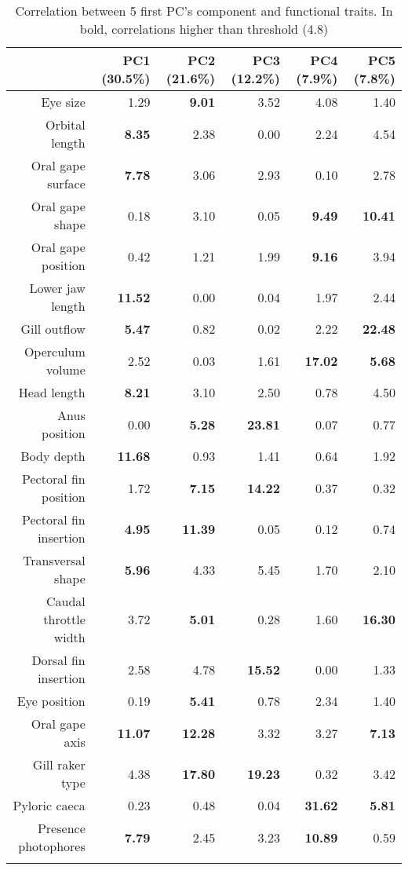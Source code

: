 \begin{table}[ht]
\centering
\caption{Correlation between 5 first PC's component and functional traits. In bold, correlations higher than threshold (4.8)}
\label{table:cont_abs}
\begin{adjustbox}{max width=1.1\textwidth,center}
\begin{tabular}{rrrrrr}
  \hline
 & PC1 (30.5\%) & PC2 (21.6\%) & PC3 (12.2\%) & PC4 (7.9\%) & PC5 (7.8\%) \\ 
  \hline
  Eye size & 1.29 & \textbf{9.01} & 3.52 & 4.08 & 1.40 \\ 
  Orbital length & \textbf{8.35} & 2.38 & 0.00 & 2.24 & 4.54 \\ 
  Oral gape surface & \textbf{7.78} & 3.06 & 2.93 & 0.10 & 2.78 \\ 
  Oral gape shape & 0.18 & 3.10 & 0.05 & \textbf{9.49} & \textbf{10.41} \\ 
  Oral gape position & 0.42 & 1.21 & 1.99 & \textbf{9.16} & 3.94 \\ 
  Lower jaw length & \textbf{11.52} & 0.00 & 0.04 & 1.97 & 2.44 \\ 
  Gill outflow & \textbf{5.47} & 0.82 & 0.02 & 2.22 & \textbf{22.48} \\ 
  Operculum volume & 2.52 & 0.03 & 1.61 & \textbf{17.02} & \textbf{5.68} \\ 
  Head length & \textbf{8.21} & 3.10 & 2.50 & 0.78 & 4.50 \\ 
  Anus position & 0.00 & \textbf{5.28} & \textbf{23.81} & 0.07 & 0.77 \\ 
  Body depth & \textbf{11.68} & 0.93 & 1.41 & 0.64 & 1.92 \\ 
  Pectoral fin position & 1.72 & \textbf{7.15} & \textbf{14.22} & 0.37 & 0.32 \\ 
  Pectoral fin insertion & \textbf{4.95} & \textbf{11.39} & 0.05 & 0.12 & 0.74 \\ 
  Transversal shape & \textbf{5.96} & 4.33 & 5.45 & 1.70 & 2.10 \\ 
  Caudal throttle width & 3.72 & \textbf{5.01} & 0.28 & 1.60 & \textbf{16.30} \\ 
  Dorsal fin insertion & 2.58 & 4.78 & \textbf{15.52} & 0.00 & 1.33 \\ 
  Eye position & 0.19 & \textbf{5.41} & 0.78 & 2.34 & 1.40 \\ 
  Oral gape axis & \textbf{11.07} & \textbf{12.28} & 3.32 & 3.27 & \textbf{7.13} \\ 
  Gill raker type & 4.38 & \textbf{17.80} & \textbf{19.23} & 0.32 & 3.42 \\ 
  Pyloric caeca & 0.23 & 0.48 & 0.04 & \textbf{31.62} & \textbf{5.81} \\ 
  Presence photophores & \textbf{7.79} & 2.45 & 3.23 & \textbf{10.89} & 0.59 \\  \\ 
   \hline
\end{tabular}
\end{adjustbox}
\end{table}

